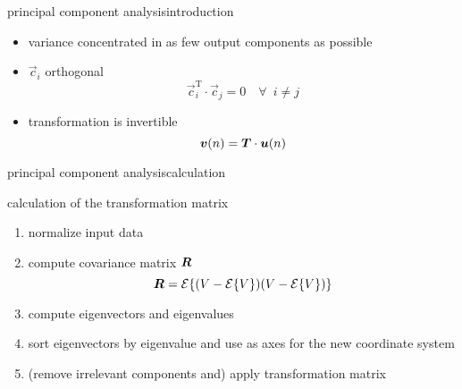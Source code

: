 \begin{frame}{principal component analysis}{introduction}
\begin{itemize}
\begin{itemize}
										\item<2->	variance concentrated in as few output components as possible
										\item<2->	$\vec{c}_i$ orthogonal
														\begin{equation*}
																\vec{c}_i^\mathrm{T}\cdot \vec{c}_j = 0\quad \forall\enspace i \neq j
														\end{equation*}
										\item<2->	transformation is invertible
														\begin{equation*}\label{eq:pca_syn}
																\vec{v}(n) = \mat{T}\cdot\vec{u}(n)
														\end{equation*}
								\end{itemize}
				\end{itemize}
\end{frame}

\begin{frame}{principal component analysis}{calculation}
	\vspace{-3mm}
	
	\vspace{-5mm}
	\pause
	calculation of the transformation matrix
	\begin{enumerate}
						\item normalize input data
		\item	compute covariance matrix $\mat{R}$
								\begin{equation*}
				\mat{R} = \mathcal{E}\lbrace(V-\mathcal{E}\lbrace V\rbrace)(V-\mathcal{E}\lbrace V\rbrace)\rbrace%
			\end{equation*}
		\item	compute eigenvectors and eigenvalues
		\item	sort eigenvectors by eigenvalue and use as axes for the new coordinate system
						\item   (remove irrelevant components and) apply transformation matrix
	\end{enumerate}
\end{frame}

